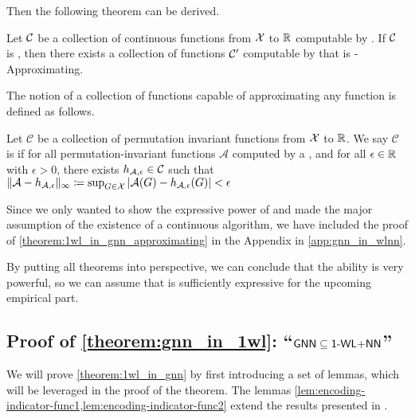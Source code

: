 Then the following theorem can be derived.

\begin{theorem}\label{theorem:1wl_in_gnn_approximating}
    Let $\mathcal{C}$ be a collection of continuous functions from $\mathcal{X}$ to $\mathbb{R}$ computable by \wlnn. If $\mathcal{C}$ is \wldisc, then there exists a collection of functions $\mathcal{C}'$ computable by \wlnn that is \gnn-Approximating.
\end{theorem}

The notion of a collection of functions capable of approximating any \gnn function is defined as follows.
\begin{definition}[\gapp]
    Let $\mathcal{C}$ be a collection of permutation invariant functions from $\mathcal{X}$ to $\mathbb{R}$. We say $\mathcal{C}$ is \gapp if for all permutation-invariant functions $\mathcal{A}$ computed by a \gnn, and for all $\epsilon \in \mathbb{R}$ with $\epsilon > 0$, there exists $h_{\mathcal{A},\epsilon} \in \mathcal{C}$ such that $\| \mathcal{A} - h_{\mathcal{A},\epsilon} \|_\infty \coloneqq \sup_{G \in \mathcal{X}} |\mathcal{A}(G) - h_{\mathcal{A},\epsilon}(G)| < \epsilon$
\end{definition}

Since we only wanted to show the expressive power of \wldisc and made the major assumption of the existence of a continuous \wl algorithm, we have included the proof of \cref{theorem:1wl_in_gnn_approximating} in the Appendix in \cref{app:gnn_in_wlnn}.

By putting all theorems into perspective, we can conclude that the ability \wldisc is very powerful, so we can assume that \wlnn is sufficiently expressive for the upcoming empirical part. 






\subsection{Proof of \cref*{theorem:gnn_in_1wl}: ``$\textsf{GNN} \subseteq \textsf{1-WL$+$NN}$''}\label{sec:proof_theorem:1wl_in_gnn}
We will prove \cref{theorem:1wl_in_gnn} by first introducing a set of lemmas, which will be leveraged in the proof of the theorem. The lemmas \cref{lem:encoding-indicator-func1,lem:encoding-indicator-func2} extend the results presented in \cite{Chen2019}.


